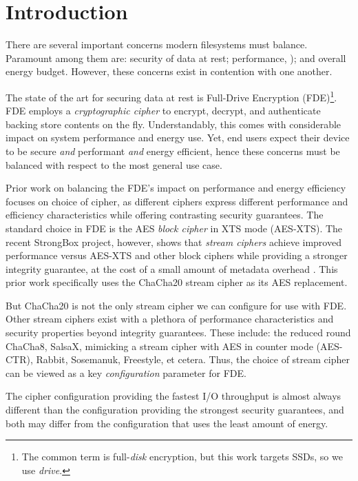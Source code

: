 \section{Introduction}\label{sec:introduction}

There are several important concerns modern filesystems must balance. Paramount
among them are: security of data at rest; performance, ); and overall energy budget. However, these concerns exist in
contention with one another.

The state of the art for securing data at rest is Full-Drive Encryption
(FDE)\footnote{The common term is full-\emph{disk} encryption, but this work
targets SSDs, so we use \emph{drive}.}. FDE employs a \emph{cryptographic
cipher} to encrypt, decrypt, and authenticate backing store contents on the fly.
Understandably, this comes with considerable impact on system performance and
energy use.  Yet, end users expect their device to be secure
\emph{and} performant \emph{and} energy efficient, hence these concerns must be
balanced with respect to the most general use case.

Prior work on balancing the FDE's impact on performance and energy efficiency
focuses on choice of cipher, as different ciphers express different performance
and efficiency characteristics while offering contrasting security guarantees.
The standard choice in FDE is the AES \emph{block cipher} in XTS mode (AES-XTS).
The recent StrongBox project, however, shows that \emph{stream ciphers} achieve
improved performance versus AES-XTS and other block ciphers while providing a
stronger integrity guarantee, at the cost of a small amount of metadata overhead
\cite{StrongBox}. This prior work specifically uses the ChaCha20 stream
cipher\cite{ChaCha20} as its AES replacement.

But ChaCha20 is not the only stream cipher we can configure for use with FDE.
Other stream ciphers exist with a plethora of performance characteristics and
security properties beyond integrity guarantees. These include: the reduced
round ChaCha8\cite{ChaCha8}, SalsaX\cite{SalsaX}, mimicking a stream cipher with
AES in counter mode (AES-CTR)\cite{AES-CTR}, Rabbit\cite{Rabbit},
Sosemanuk\cite{Sosemanuk}, Freestyle\cite{Freestyle}, et cetera. Thus, the
choice of stream cipher can be viewed as a key \emph{configuration} parameter
for FDE.

The cipher configuration providing the fastest I/O throughput is almost always
different than the configuration providing the strongest security guarantees,
and both may differ from the configuration that uses the least amount of energy.

